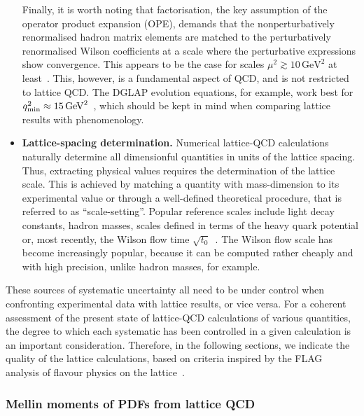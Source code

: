 \begin{itemize}
Finally, it is worth noting that factorisation, the key assumption of
the operator product expansion (OPE), demands that the
nonperturbatively renormalised hadron matrix elements are matched to the
perturbatively renormalised Wilson coefficients at a scale where the perturbative 
expressions show convergence. This appears to be
the case for scales $\mu^2 \gtrsim 10 \, \mbox{GeV}^2$ at
least~\cite{Gockeler:2010yr}. This, however, is a fundamental aspect
of QCD, and is not restricted to lattice QCD. The DGLAP evolution equations,
for example, work best for $q^2_{\rm min} \approx
15 \, \mbox{GeV}^2$~\cite{Abramowicz:2015mha}, which should be kept in
mind when comparing lattice results with phenomenology.

\item {\bfseries Lattice-spacing determination.} Numerical lattice-QCD calculations 
naturally determine all dimensionful quantities in units of the
lattice spacing. Thus, extracting physical values requires the
determination of the lattice scale. This is achieved by matching a
quantity with mass-dimension to its experimental value or through a
well-defined theoretical procedure, that is referred to as
``scale-setting''. Popular reference scales include light decay
constants, hadron masses, scales defined in terms of the heavy quark
potential or, most recently, the Wilson flow time
$\sqrt{t_0}$~\cite{Luscher:2010iy}. The Wilson flow scale has become
increasingly popular, because it can be computed rather cheaply and
with high precision, unlike hadron masses, for example.

\end{itemize}

These sources of systematic uncertainty all need to be under control
when confronting experimental data with lattice results, or vice
versa. For a coherent assessment of the present state of lattice-QCD
calculations of various quantities, the degree to which each
systematic has been controlled in a given calculation is an important
consideration. Therefore, in the following sections, we indicate the
quality of the lattice calculations, based on criteria inspired by the
FLAG analysis of flavour physics on the lattice~\cite{Aoki:2016frl}.


\subsubsection{Mellin moments of PDFs from lattice QCD}
\label{Sec:MomentsLQCD}


